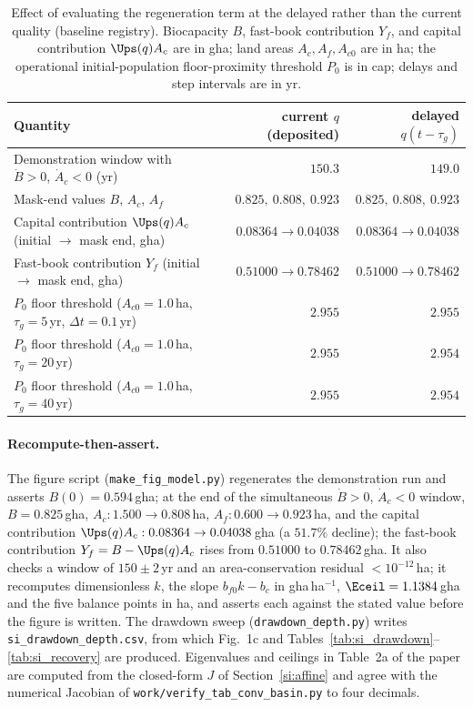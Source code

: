 \begin{table}[htbp]
\centering\small
\caption{Effect of evaluating the regeneration term at the delayed rather than the current quality (baseline registry). Biocapacity $B$, fast-book contribution $Y_f$, and capital contribution $\Ups(q)A_c$ are in gha; land areas $A_c,A_f,A_{c0}$ are in ha; the operational initial-population floor-proximity threshold $P_0$ is in cap; delays and step intervals are in yr.}
\label{tab:si_delay}
\begin{tabular}{l r r}
\toprule
Quantity & current $q$ (deposited) & delayed $q(t-\tau_g)$ \\
\midrule
Demonstration window with $\dot B>0$, $\dot A_c<0$ (yr) & $150.3$ & $149.0$ \\
Mask-end values $B$, $A_c$, $A_f$ & $0.825,\ 0.808,\ 0.923$ & $0.825,\ 0.808,\ 0.923$ \\
Capital contribution $\Ups(q)A_c$ (initial $\to$ mask end, gha) & $0.08364\to0.04038$ & $0.08364\to0.04038$ \\
Fast-book contribution $Y_f$ (initial $\to$ mask end, gha) & $0.51000\to0.78462$ & $0.51000\to0.78462$ \\
$P_0$ floor threshold ($A_{c0}=1.0$\,ha, $\tau_g=5$\,yr, $\Delta t=0.1$\,yr) & $2.955$ & $2.955$ \\
$P_0$ floor threshold ($A_{c0}=1.0$\,ha, $\tau_g=20$\,yr) & $2.955$ & $2.954$ \\
$P_0$ floor threshold ($A_{c0}=1.0$\,ha, $\tau_g=40$\,yr) & $2.955$ & $2.954$ \\
\bottomrule
\end{tabular}
\end{table}

\paragraph{Recompute-then-assert.} The figure script (\texttt{make\_fig\_model.py}) regenerates the demonstration run and asserts $B(0)=0.594$\,gha; at the end of the simultaneous $\dot B>0$, $\dot A_c<0$ window, $B=0.825$\,gha, $A_c:1.500\to0.808$\,ha, $A_f:0.600\to0.923$\,ha, and the capital contribution $\Ups(q)A_c:0.08364\to0.04038$\,gha (a $51.7\%$ decline); the fast-book contribution $Y_f=B-\Ups(q)A_c$ rises from $0.51000$ to $0.78462$\,gha. It also checks a window of $150\pm2$\,yr and an area-conservation residual $<10^{-12}$\,ha; it recomputes dimensionless $k$, the slope $b_{f0}k-b_c$ in gha\,ha$^{-1}$, $\Eceil=1.1384$\,gha and the five balance points in ha, and asserts each against the stated value before the figure is written. The drawdown sweep (\texttt{drawdown\_depth.py}) writes \texttt{si\_drawdown\_depth.csv}, from which Fig.~1c and Tables~\ref{tab:si_drawdown}--\ref{tab:si_recovery} are produced. Eigenvalues and ceilings in Table~2a of the paper are computed from the closed-form $J$ of Section~\ref{si:affine} and agree with the numerical Jacobian of \texttt{work/verify\_tab\_conv\_basin.py} to four decimals.

